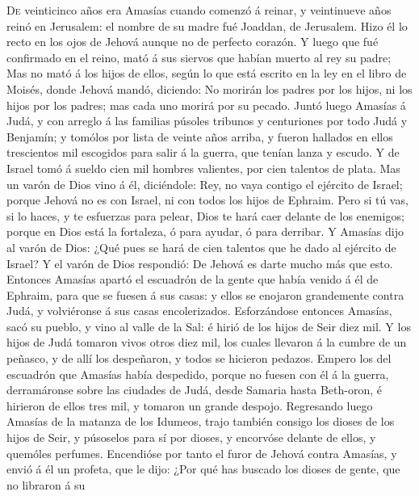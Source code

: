  \textsc{De} veinticinco años era Amasías cuando comenzó á
reinar, y veintinueve años reinó en Jerusalem: el nombre de su madre fué
Joaddan, de Jerusalem.  Hizo él lo recto en los ojos de
Jehová aunque no de perfecto corazón.  Y luego que fué
confirmado en el reino, mató á sus siervos que habían muerto al rey su
padre;  Mas no mató á los hijos de ellos, según lo que
está escrito en la ley en el libro de Moisés, donde Jehová mandó,
diciendo: No morirán los padres por los hijos, ni los hijos por los
padres; mas cada uno morirá por su pecado.  Juntó luego
Amasías á Judá, y con arreglo á las familias púsoles tribunos y
centuriones por todo Judá y Benjamín; y tomólos por lista de veinte años
arriba, y fueron hallados en ellos trescientos mil escogidos para salir
á la guerra, que tenían lanza y escudo.  Y de Israel tomó
á sueldo cien mil hombres valientes, por cien talentos de plata.
 Mas un varón de Dios vino á él, diciéndole: Rey, no vaya
contigo el ejército de Israel; porque Jehová no es con Israel, ni con
todos los hijos de Ephraim.  Pero si tú vas, si lo haces,
y te esfuerzas para pelear, Dios te hará caer delante de los enemigos;
porque en Dios está la fortaleza, ó para ayudar, ó para derribar.
 Y Amasías dijo al varón de Dios: ¿Qué pues se hará de
cien talentos que he dado al ejército de Israel? Y el varón de Dios
respondió: De Jehová es darte mucho más que esto. 
Entonces Amasías apartó el escuadrón de la gente que había venido á él
de Ephraim, para que se fuesen á sus casas: y ellos se enojaron
grandemente contra Judá, y volviéronse á sus casas encolerizados.
 Esforzándose entonces Amasías, sacó su pueblo, y vino al
valle de la Sal: é hirió de los hijos de Seir diez mil. 
Y los hijos de Judá tomaron vivos otros diez mil, los cuales llevaron á
la cumbre de un peñasco, y de allí los despeñaron, y todos se hicieron
pedazos.  Empero los del escuadrón que Amasías había
despedido, porque no fuesen con él á la guerra, derramáronse sobre las
ciudades de Judá, desde Samaria hasta Beth-oron, é hirieron de ellos
tres mil, y tomaron un grande despojo.  Regresando luego
Amasías de la matanza de los Idumeos, trajo también consigo los dioses
de los hijos de Seir, y púsoselos para sí por dioses, y encorvóse
delante de ellos, y quemóles perfumes.  Encendióse por
tanto el furor de Jehová contra Amasías, y envió á él un profeta, que le
dijo: ¿Por qué has buscado los dioses de gente, que no libraron á su
